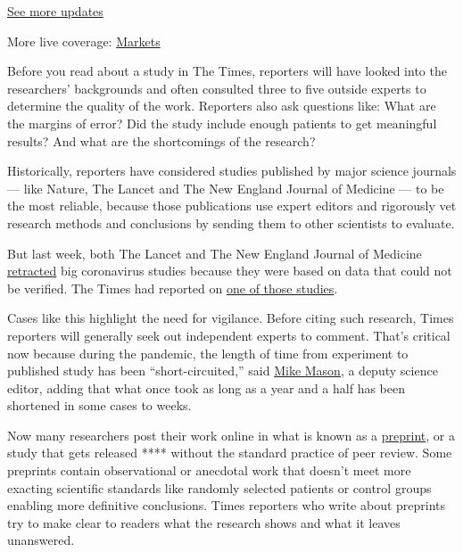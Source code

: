 \href{https://www.nytimes3xbfgragh.onion/2020/09/11/world/covid-19-coronavirus.html?action=click\&pgtype=Article\&state=default\&region=MAIN_CONTENT_1\&context=storylines_live_updates}{See
more updates}

More live coverage:
\href{https://www.nytimes3xbfgragh.onion/live/2020/09/11/business/stock-market-today-coronavirus?action=click\&pgtype=Article\&state=default\&region=MAIN_CONTENT_1\&context=storylines_live_updates}{Markets}

Before you read about a study in The Times, reporters will have looked
into the researchers' backgrounds and often consulted three to five
outside experts to determine the quality of the work. Reporters also ask
questions like: What are the margins of error? Did the study include
enough patients to get meaningful results? And what are the shortcomings
of the research?

Historically, reporters have considered studies published by major
science journals --- like Nature, The Lancet and The New England Journal
of Medicine --- to be the most reliable, because those publications use
expert editors and rigorously vet research methods and conclusions by
sending them to other scientists to evaluate.

But last week, both The Lancet and The New England Journal of Medicine
\href{https://www.nytimes3xbfgragh.onion/2020/06/04/health/coronavirus-hydroxychloroquine.html?searchResultPosition=4}{retracted}
big coronavirus studies because they were based on data that could not
be verified. The Times had reported on
\href{https://www.nytimes3xbfgragh.onion/2020/05/22/health/malaria-drug-trump-coronavirus.html?searchResultPosition=2}{one
of those studies}.

Cases like this highlight the need for vigilance. Before citing such
research, Times reporters will generally seek out independent experts to
comment. That's critical now because during the pandemic, the length of
time from experiment to published study has been ``short-circuited,''
said
\href{https://www.nytimes3xbfgragh.onion/2017/10/06/insider/cuba-illness-sonic-weapons.html}{Mike
Mason}, a deputy science editor, adding that what once took as long as a
year and a half has been shortened in some cases to weeks.

Now many researchers post their work online in what is known as a
\href{https://www.nytimes3xbfgragh.onion/2020/04/14/science/coronavirus-disinformation.html?smid=em-share}{preprint},
or a study that gets released **** without the standard practice of peer
review. Some preprints contain observational or anecdotal work that
doesn't meet more exacting scientific standards like randomly selected
patients or control groups enabling more definitive conclusions. Times
reporters who write about preprints try to make clear to readers what
the research shows and what it leaves unanswered.

